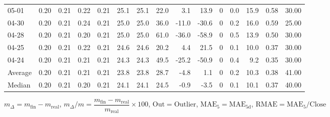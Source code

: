 \begin{threeparttable}
{\begin{tabular}{lrrrrrrrrrrrrrr}
  05-01 &          0.20 &          0.21 &          0.22 &        0.21 &                25.1 &               25.1 &                22.0 &        3.1 &         13.9 &              0 &                 0.0 &             15.9 &            0.58 &                  30.00 \\
  04-30 &          0.20 &          0.21 &          0.24 &        0.21 &                25.0 &               25.0 &                36.0 &      -11.0 &        -30.6 &              0 &                 0.2 &             16.0 &            0.59 &                  25.00 \\
  04-28 &          0.20 &          0.21 &          0.20 &        0.21 &                25.0 &               25.0 &                61.0 &      -36.0 &        -58.9 &              0 &                 0.5 &             13.9 &            0.50 &                  30.00 \\
  04-25 &          0.20 &          0.21 &          0.22 &        0.21 &                24.6 &               24.6 &                20.2 &        4.4 &         21.5 &              0 &                 0.1 &             10.0 &            0.37 &                  30.00 \\
  04-24 &          0.20 &          0.21 &          0.21 &        0.21 &                24.3 &               24.3 &                49.5 &      -25.2 &        -50.9 &              0 &                 0.4 &              9.2 &            0.35 &                  30.00 \\
Average &          0.20 &          0.21 &          0.21 &        0.21 &                23.8 &               23.8 &                28.7 &       -4.8 &          1.1 &              0 &                 0.2 &             10.3 &            0.38 &                  41.00 \\
 Median &          0.20 &          0.21 &          0.20 &        0.21 &                24.1 &               24.1 &                24.5 &       -0.9 &         -3.5 &              0 &                 0.1 &             10.1 &            0.37 &                  40.00 \\
\bottomrule
\end{tabular}
}
\begin{tablenotes}\footnotesize
\item $m_\Delta=m_{\text{fin}}-m_{\text{real}}$,
$m_\Delta/m=\dfrac{m_{\text{fin}}-m_{\text{real}}}{m_{\text{real}}}\times100$,
$\mathrm{Out}=\text{Outlier}$,
$\mathrm{MAE}_5=\mathrm{MAE}_{5\text{d}}$,
$\mathrm{RMAE}=\mathrm{MAE}_5/\text{Close}$
\end{tablenotes}
\end{threeparttable}
\endgroup


